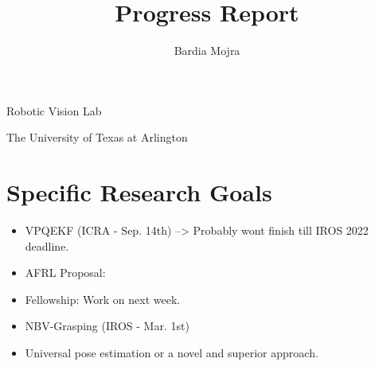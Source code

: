 \documentclass[11pt]{article}
\title{Progress Report}
\author{Bardia Mojra}
\begin{document}
\maketitle
\thispagestyle{empty}

\bigskip
\bigskip
\begin{center}
      Robotic Vision Lab
\end{center}

\begin{center}
      The University of Texas at Arlington
\end{center}

\newpage

\section{Specific Research Goals}
\begin{itemize}
      \item VPQEKF (ICRA - Sep. 14th) --> Probably wont finish till IROS 2022 deadline.
      \item AFRL Proposal:
      \item Fellowship: Work on next week.
      \item NBV-Grasping (IROS - Mar. 1st)
      \item Universal pose estimation or a novel and superior approach.
\end{itemize}
\end{document}
